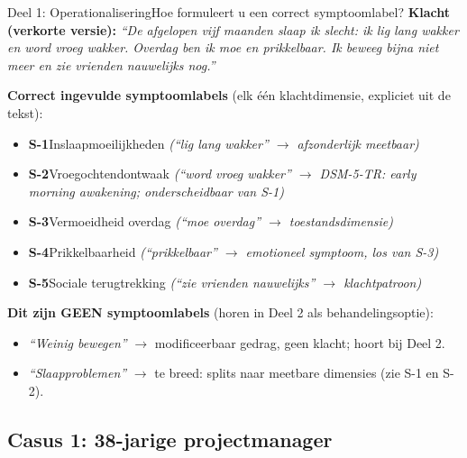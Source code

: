 \documentclass[11pt,a4paper]{article}
\begin{document}
\begin{voorbeeldbox}{Deel 1: Operationalisering}{Hoe formuleert u een correct symptoomlabel?}
\small
\textbf{Klacht (verkorte versie):} \textit{``De afgelopen vijf maanden slaap ik slecht:
ik lig lang wakker en word vroeg wakker. Overdag ben ik moe en prikkelbaar. Ik beweeg
bijna niet meer en zie vrienden nauwelijks nog.''}

\medskip
\textbf{Correct ingevulde symptoomlabels} (elk één klachtdimensie, expliciet uit de tekst):
\begin{itemize}[topsep=2pt,itemsep=1pt]
\item \textbf{S-1}\enspace Inslaapmoeilijkheden
  \hfill\textit{(``lig lang wakker'' $\rightarrow$ afzonderlijk meetbaar)}
\item \textbf{S-2}\enspace Vroegochtendontwaak
  \hfill\textit{(``word vroeg wakker'' $\rightarrow$ DSM-5-TR: early morning awakening; onderscheidbaar van S-1)}
\item \textbf{S-3}\enspace Vermoeidheid overdag
  \hfill\textit{(``moe overdag'' $\rightarrow$ toestandsdimensie)}
\item \textbf{S-4}\enspace Prikkelbaarheid
  \hfill\textit{(``prikkelbaar'' $\rightarrow$ emotioneel symptoom, los van S-3)}
\item \textbf{S-5}\enspace Sociale terugtrekking
  \hfill\textit{(``zie vrienden nauwelijks'' $\rightarrow$ klachtpatroon)}
\end{itemize}

\medskip
\textbf{\color{StrongRed}Dit zijn GEEN symptoomlabels} (horen in Deel 2 als behandelingsoptie):
\begin{itemize}[topsep=1pt,itemsep=0pt]
\item \textit{``Weinig bewegen''} $\rightarrow$ modificeerbaar gedrag, geen klacht; hoort bij Deel 2.
\item \textit{``Slaapproblemen''} $\rightarrow$ te breed: splits naar meetbare dimensies (zie S-1 en S-2).
\end{itemize}
\end{voorbeeldbox}

\vspace{0.5em}

\newpage

\subsection*{Casus 1: 38-jarige projectmanager}
\end{document}
